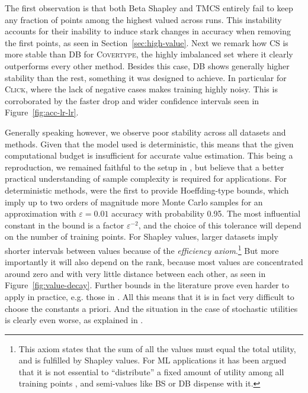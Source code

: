 \documentclass[10pt]{article}
\newcommand{\tmem}[1]{{\em #1\/}}
\newcommand{\tmname}[1]{\textsc{#1}}
\begin{document}
The first observation is that both Beta Shapley and TMCS entirely fail to keep
any fraction of points among the highest valued across runs. This instability
accounts for their inability to induce stark changes in accuracy when removing
the first points, as seen in  Section~\ref{sec:high-value}. Next we remark how
CS is more stable than DB for {\tmname{Covertype}}, the highly imbalanced set
where it clearly outperforms every other method. Besides this case, DB shows
generally higher stability than the rest, something it was designed to
achieve. In particular for {\tmname{Click}}, where the lack of negative cases
makes training highly noisy. This is corroborated by the faster drop and wider
confidence intervals seen in  Figure~\ref{fig:acc-lr-lr}.

Generally speaking however, we observe poor stability across all datasets and
methods. Given that the model used is deterministic, this means that the given
computational budget is insufficient for accurate value estimation. This being
a reproduction, we remained faithful to the setup in
{\cite{schoch_csshapley_2022}}, but believe that a better practical
understanding of sample complexity is required for applications. For
deterministic methods, {\cite{maleki_bounding_2014}} were the first to
provide Hoeffding-type bounds, which imply up to two orders of magnitude more
Monte Carlo samples for an approximation with $\varepsilon = 0.01$ accuracy
with probability 0.95. The most influential constant in the bound is a factor
$\varepsilon^{- 2}$, and the choice of this tolerance will depend on the
number of training points. For Shapley values, larger datasets imply shorter
intervals between values because of the {\tmem{efficiency
axiom}}.\footnote{This axiom states that the sum of all the values must equal
the total utility, and is fulfilled by Shapley values. For ML applications it
has been argued that it is not essential to ``distribute'' a fixed amount of
utility among all training points {\cite{kwon_beta_2022}}, and semi-values
like BS or DB dispense with it.} But more importantly it will also depend on
the rank, because most values are concentrated around zero and with very
little distance between each other, as seen in  Figure~\ref{fig:value-decay}.
Further bounds in the literature prove even harder to apply in practice, e.g.
those in {\cite{watson_accelerated_2023}}. All this means that it is in fact
very difficult to choose the constants a priori. And the situation in the case
of stochastic utilities is clearly even worse, as explained in
{\cite{wang_data_2022}}.
\end{document}
